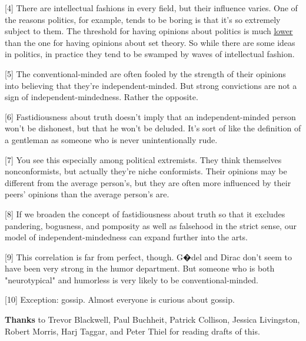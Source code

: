 [4] There are intellectual fashions in every field, but their
                  influence varies. One of the reasons politics, for example,
                  tends to be boring is that it's so extremely subject to them.
                  The threshold for having opinions about politics is much
                  \href{http://www.paulgraham.com/identity.html}{\underline{lower}} than the one for
                  having opinions about set theory. So while there are some
                  ideas in politics, in practice they tend to be swamped by
                  waves of intellectual fashion.

[5] The conventional-minded are often fooled by the strength of
                  their opinions into believing that they're independent-minded.
                  But strong convictions are not a sign of
                  independent-mindedness. Rather the opposite.

[6] Fastidiousness about truth doesn't imply that an
                  independent-minded person won't be dishonest, but that he
                  won't be deluded. It's sort of like the definition of a
                  gentleman as someone who is never unintentionally rude.

[7] You see this especially among political extremists. They
                  think themselves nonconformists, but actually they're niche
                  conformists. Their opinions may be different from the average
                  person's, but they are often more influenced by their peers'
                  opinions than the average person's are.

[8] If we broaden the concept of fastidiousness about truth so
                  that it excludes pandering, bogusness, and pomposity as well
                  as falsehood in the strict sense, our model of
                  independent-mindedness can expand further into the arts.

[9] This correlation is far from perfect, though. G�del and
                  Dirac don't seem to have been very strong in the humor
                  department. But someone who is both "neurotypical" and
                  humorless is very likely to be conventional-minded.

[10] Exception: gossip. Almost everyone is curious about
                  gossip.




                  \textbf{Thanks} to Trevor Blackwell, Paul Buchheit, Patrick
                  Collison, Jessica Livingston, Robert Morris, Harj Taggar, and
                  Peter Thiel for reading drafts of this.


              
            
          
